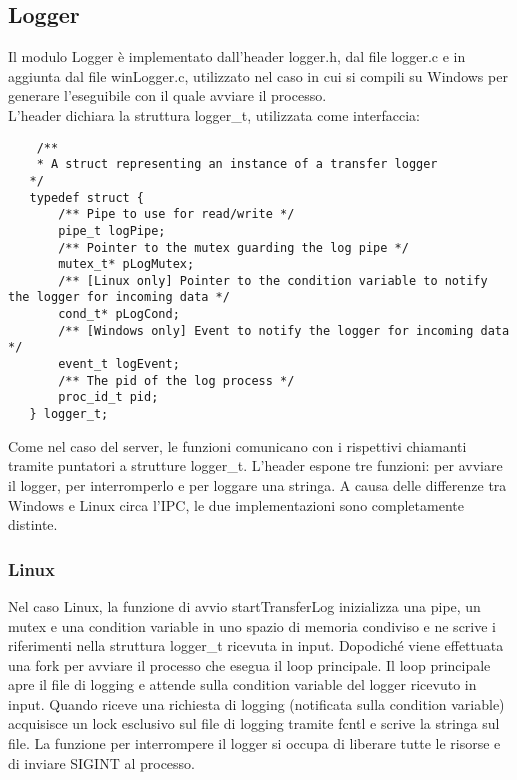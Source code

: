 \documentclass{article}
\begin{document}
\subsection{Logger}
Il modulo Logger è implementato dall'header logger.h, dal file logger.c e in aggiunta dal file winLogger.c,
utilizzato nel caso in cui si compili su Windows per generare l'eseguibile con il quale avviare il processo.\\
L'header dichiara la struttura logger\_t, utilizzata come interfaccia:
\begin{lstlisting}
    /**
    * A struct representing an instance of a transfer logger
   */
   typedef struct {
       /** Pipe to use for read/write */
       pipe_t logPipe;
       /** Pointer to the mutex guarding the log pipe */
       mutex_t* pLogMutex;
       /** [Linux only] Pointer to the condition variable to notify the logger for incoming data */
       cond_t* pLogCond;
       /** [Windows only] Event to notify the logger for incoming data */
       event_t logEvent;
       /** The pid of the log process */
       proc_id_t pid;
   } logger_t;
\end{lstlisting}
Come nel caso del server, le funzioni comunicano con i rispettivi chiamanti tramite puntatori a 
strutture logger\_t.
L'header espone tre funzioni: per avviare il logger, per interromperlo e per loggare una stringa.
A causa delle differenze tra Windows e Linux circa l'IPC, le due implementazioni sono completamente distinte.

\subsubsection{Linux}
Nel caso Linux, la funzione di avvio startTransferLog inizializza una pipe, un mutex e una condition variable
in uno spazio di memoria condiviso e ne scrive i riferimenti nella struttura logger\_t ricevuta in input.
Dopodiché viene effettuata una fork per avviare il processo che esegua il loop principale.
Il loop principale apre il file di logging e attende sulla condition variable del logger ricevuto in input.
Quando riceve una richiesta di logging (notificata sulla condition variable) acquisisce un lock
esclusivo sul file di logging tramite fcntl e scrive la stringa sul file.
La funzione per interrompere il logger si occupa di liberare tutte le risorse e di inviare SIGINT
al processo.
\end{document}
